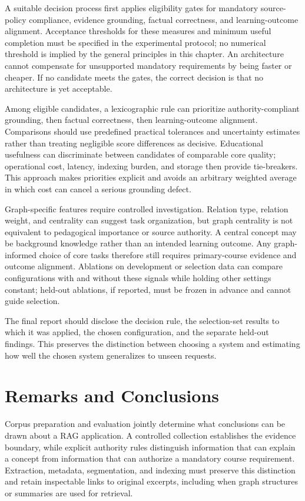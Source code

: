 \documentclass[12pt,a4paper]{report}
\numberwithin{equation}{chapter}
\begin{document}
A suitable decision process first applies eligibility gates for mandatory source-policy compliance, evidence grounding, factual correctness, and learning-outcome alignment. Acceptance thresholds for these measures and minimum useful completion must be specified in the experimental protocol; no numerical threshold is implied by the general principles in this chapter. An architecture cannot compensate for unsupported mandatory requirements by being faster or cheaper. If no candidate meets the gates, the correct decision is that no architecture is yet acceptable.

Among eligible candidates, a lexicographic rule can prioritize authority-compliant grounding, then factual correctness, then learning-outcome alignment. Comparisons should use predefined practical tolerances and uncertainty estimates rather than treating negligible score differences as decisive. Educational usefulness can discriminate between candidates of comparable core quality; operational cost, latency, indexing burden, and storage then provide tie-breakers. This approach makes priorities explicit and avoids an arbitrary weighted average in which cost can cancel a serious grounding defect.

Graph-specific features require controlled investigation. Relation type, relation weight, and centrality can suggest task organization, but graph centrality is not equivalent to pedagogical importance or source authority. A central concept may be background knowledge rather than an intended learning outcome. Any graph-informed choice of core tasks therefore still requires primary-course evidence and outcome alignment. Ablations on development or selection data can compare configurations with and without these signals while holding other settings constant; held-out ablations, if reported, must be frozen in advance and cannot guide selection.

The final report should disclose the decision rule, the selection-set results to which it was applied, the chosen configuration, and the separate held-out findings. This preserves the distinction between choosing a system and estimating how well the chosen system generalizes to unseen requests.

\section{Remarks and Conclusions}

Corpus preparation and evaluation jointly determine what conclusions can be drawn about a RAG application. A controlled collection establishes the evidence boundary, while explicit authority rules distinguish information that can explain a concept from information that can authorize a mandatory course requirement. Extraction, metadata, segmentation, and indexing must preserve this distinction and retain inspectable links to original excerpts, including when graph structures or summaries are used for retrieval.
\end{document}
